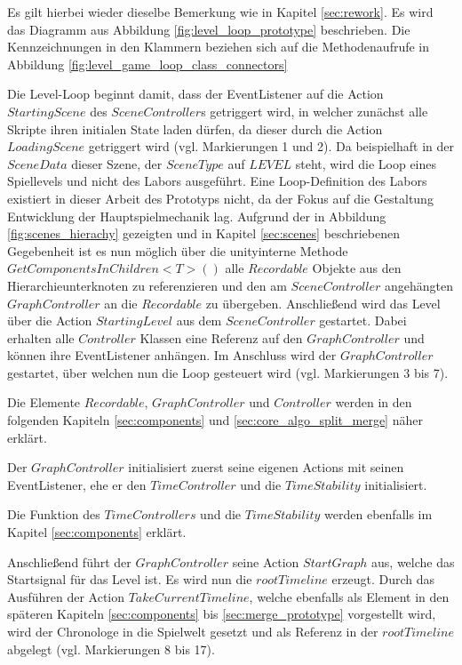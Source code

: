 Es gilt hierbei wieder dieselbe Bemerkung wie in Kapitel \ref{sec:rework}. Es wird das Diagramm aus Abbildung \ref{fig:level_loop_prototype}  beschrieben. Die Kennzeichnungen in den Klammern beziehen sich auf die Methodenaufrufe in Abbildung \ref{fig:level_game_loop_class_connectors} 

Die Level-Loop beginnt damit, dass der EventListener auf die Action $StartingScene$ des $SceneController$s getriggert wird, in welcher zunächst alle Skripte ihren initialen State laden dürfen, da dieser durch die Action $LoadingScene$ getriggert wird (vgl. Markierungen 1 und 2). Da beispielhaft in der $SceneData$ dieser Szene, der $SceneType$ auf $LEVEL$ steht, wird die Loop eines Spiellevels und nicht des Labors ausgeführt. Eine Loop-Definition des Labors existiert in dieser Arbeit des Prototyps nicht, da der Fokus auf die Gestaltung Entwicklung der Hauptspielmechanik lag. Aufgrund der in Abbildung \ref{fig:scenes_hierachy} gezeigten und in Kapitel \ref{sec:scenes} beschriebenen Gegebenheit ist es nun möglich über die unityinterne Methode $GetComponentsInChildren<T>()$ alle $Recordable$ Objekte aus den Hierarchieunterknoten zu referenzieren und den am $SceneController$ angehängten $GraphController$ an die $Recordable$ zu übergeben. Anschließend wird das Level über die Action $StartingLevel$ aus dem $SceneController$ gestartet. Dabei erhalten alle $Controller$ Klassen eine Referenz auf den $GraphController$ und können ihre EventListener anhängen. Im Anschluss wird der $GraphController$ gestartet, über welchen nun die Loop gesteuert wird (vgl. Markierungen 3 bis 7).

Die Elemente $Recordable$, $GraphController$ und $Controller$ werden in den folgenden Kapiteln \ref{sec:components} und \ref{sec:core_algo_split_merge} näher erklärt.

Der $GraphController$ initialisiert zuerst seine eigenen Actions mit seinen EventListener, ehe er den $TimeController$ und die $TimeStability$ initialisiert. 

Die Funktion des $TimeControllers$ und die $TimeStability$ werden ebenfalls im Kapitel \ref{sec:components} erklärt.

Anschließend führt der $GraphController$ seine Action $StartGraph$ aus, welche das Startsignal für das Level ist. Es wird nun die $rootTimeline$ erzeugt. Durch das Ausführen der Action $TakeCurrentTimeline$, welche ebenfalls als Element in den späteren Kapiteln \ref{sec:components} bis \ref{sec:merge_prototype} vorgestellt wird, wird der Chronologe in die Spielwelt gesetzt und als Referenz in der $rootTimeline$ abgelegt (vgl. Markierungen 8 bis 17).

